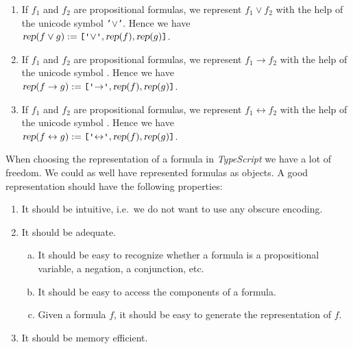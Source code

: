 \begin{enumerate}
\item If $f_1$ and $f_2$ are propositional formulas, we represent $f_1 \vee f_2$ with the help of the unicode symbol
      \texttt{'$\vee$'}. Hence we have
      \\[0.2cm]
      \hspace*{1.3cm} 
      $\textsl{rep}(f \vee g) := \texttt{[\tsq{$\vee$}}, \textsl{rep}(f), \textsl{rep}(g)\texttt{]}$.
\item If $f_1$ and $f_2$ are propositional formulas, we represent $f_1 \rightarrow f_2$ with the help of the
      unicode symbol \texttt{\tsq{$\rightarrow$}}.  
      Hence we have
      \\[0.2cm]
      \hspace*{1.3cm} 
      $\textsl{rep}(f \rightarrow g) := \texttt{[\tsq{$\rightarrow$}}, \textsl{rep}(f), \textsl{rep}(g)\texttt{]}$.
\item If $f_1$ and $f_2$ are propositional formulas, we represent $f_1 \leftrightarrow f_2$ with the help of
      the unicode symbol \texttt{\tsq{$\leftrightarrow$}}.  
      Hence we have
      \\[0.2cm]
      \hspace*{1.3cm} 
      $\textsl{rep}(f \leftrightarrow g) := \texttt{[\tsq{$\leftrightarrow$}}, \textsl{rep}(f), \textsl{rep}(g)\texttt{]}$.
\end{enumerate}
When choosing the representation of a formula in \textsl{TypeScript} we have a lot of freedom.
We could as well have represented formulas as objects.  A good representation should have
the following properties:
\begin{enumerate}
\item It should be intuitive, i.e.~we do not want to use any obscure encoding.
\item It should be adequate.
  \begin{enumerate}[(a)]
  \item It should be easy to recognize whether a formula is a propositional variable, a negation, a
        conjunction, etc.
  \item It should be easy to access the components of a formula.
  \item Given a formula $f$, it should be easy to generate the representation of $f$.
  \end{enumerate}
\item It should be memory efficient.
\end{enumerate}

